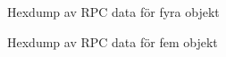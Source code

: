 \begin{figure}
    \scriptsize
    \center
    
    \caption{Hexdump av RPC data för fyra objekt}
    \label{fig:tim-rpcdata4}
\end{figure}

\begin{figure}
    \scriptsize
    \center
    
    \caption{Hexdump av RPC data för fem objekt}
    \label{fig:tim-rpcdata5}
\end{figure}

